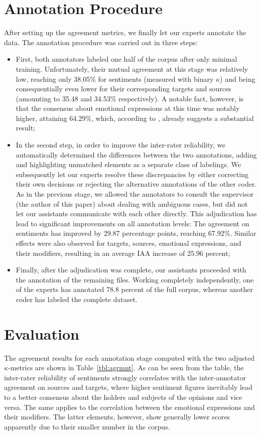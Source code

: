 \section{Annotation Procedure}\label{sec:astages}
After setting up the agreement metrics, we finally let our experts
annotate the data.  The annotation procedure was carried out in three
steps:
\begin{itemize}
  \item First, both annotators labeled one half of the corpus after
    only minimal training.  Unfortunately, their mutual agreement at
    this stage was relatively low, reaching only 38.05\% for
    sentiments (measured with binary $\kappa$) and being
    consequentially even lower for their corresponding targets and
    sources (amounting to 35.48 and 34.53\% respectively).  A notable
    fact, however, is that the consensus about emotional expressions
    at this time was notably higher, attaining 64.29\%, which,
    according to \citet{Landis:77}, already suggests a substantial
    result;
  \item In the second step, in order to improve the inter-rater
    reliability, we automatically determined the differences between
    the two annotations, adding and highlighting unmatched elements as
    a separate class of labelings. We subsequently let our experts
    resolve these discrepancies by either correcting their own
    decisions or rejecting the alternative annotations of the other
    coder.  As in the previous stage, we allowed the annotators to
    consult the supervisor (the author of this paper) about dealing
    with ambiguous cases, but did not let our assistants communicate
    with each other directly.  This adjudication has lead to
    significant improvements on all annotation levels: The agreement
    on sentiments has improved by 29.87 percentage points, reaching
    67.92\%.  Similar effects were also observed for targets, sources,
    emotional expressions, and their modifiers, resulting in an
    average IAA increase of 25.96 percent;
  \item Finally, after the adjudication was complete, our assistants
    proceeded with the annotation of the remaining files.  Working
    completely independently, one of the experts has annotated 78.8
    percent of the full corpus, whereas another coder has labeled the
    complete dataset.
\end{itemize}

\section{Evaluation}\label{sec:eval}
The agreement results for each annotation stage computed with the two
adjusted $\kappa$-metrics are shown in Table~\ref{tbl:agrmnt}.  As can
be seen from the table, the inter-rater reliability of sentiments
strongly correlates with the inter-annotator agreement on sources and
targets, where higher sentiment figures inevitably lead to a better
consensus about the holders and subjects of the opinions and vice
versa.  The same applies to the correlation between the emotional
expressions and their modifiers. The latter elements, however, show
generally lower scores apparently due to their smaller number in the
corpus.

